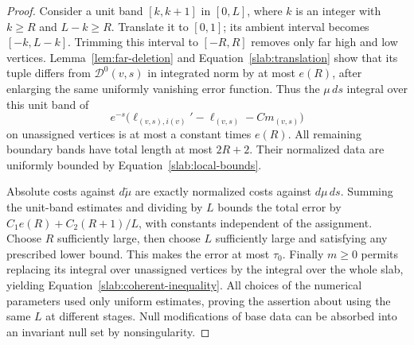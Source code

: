 \begin{proof}
Consider a unit band $[k,k+1]$ in $[0,L]$, where $k$ is an integer
with $k\geq R$ and $L-k\geq R$. Translate it to $[0,1]$; its ambient
interval becomes $[-k,L-k]$. Trimming this interval to $[-R,R]$
removes only far high and low vertices. Lemma~\ref{lem:far-deletion}
and Equation~\eqref{slab:translation} show that its tuple differs
from $\mathcal D^0(v,s)$ in integrated norm by at most $e(R)$, after
enlarging the same uniformly vanishing error function. Thus the
$\mu\,ds$ integral over this unit band of
\[
 e^{-s}\bigl(\ell_{(v,s),i(v)}'-\ell_{(v,s)}-Cm_{(v,s)}\bigr)
\]
on unassigned vertices is at most a constant times $e(R)$. All
remaining boundary bands have total length at most $2R+2$. Their
normalized data are uniformly bounded by
Equation~\eqref{slab:local-bounds}.

Absolute costs against $d\widetilde\mu$ are exactly normalized costs
against $d\mu\,ds$. Summing the unit-band estimates and dividing by
$L$ bounds the total error by
$C_1e(R)+C_2(R+1)/L$, with constants independent of the assignment.
Choose $R$ sufficiently large, then choose $L$ sufficiently large
and satisfying any prescribed lower bound. This makes the error at
most $\tau_0$. Finally $m\geq0$ permits replacing its integral over
unassigned vertices by the integral over the whole slab, yielding
Equation~\eqref{slab:coherent-inequality}. All choices of the numerical
parameters used only uniform estimates, proving the assertion about
using the same $L$ at different stages. Null modifications of base
data can be absorbed into an invariant null set by nonsingularity.
\end{proof}



